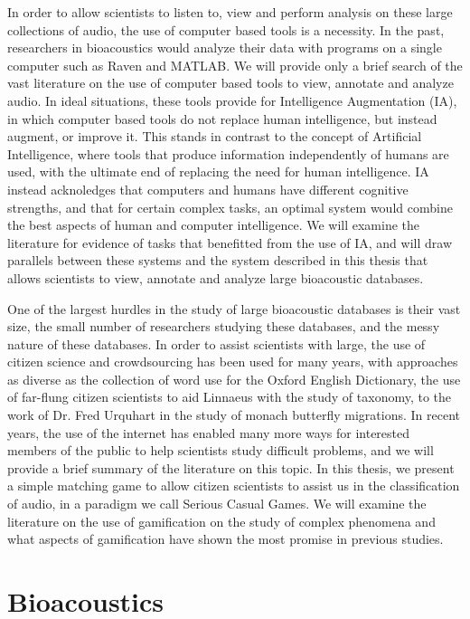 In order to allow scientists to listen to, view and perform analysis
on these large collections of audio, the use of computer based tools
is a necessity.  In the past, researchers in bioacoustics would
analyze their data with programs on a single computer such as Raven
and MATLAB.  We will provide only a brief search of the vast
literature on the use of computer based tools to view, annotate and
analyze audio.  In ideal situations, these tools provide for
Intelligence Augmentation (IA), in which computer based tools do not
replace human intelligence, but instead augment, or improve it.  This
stands in contrast to the concept of Artificial Intelligence, where
tools that produce information independently of humans are used, with
the ultimate end of replacing the need for human intelligence.  IA
instead acknoledges that computers and humans have different cognitive
strengths, and that for certain complex tasks, an optimal system would
combine the best aspects of human and computer intelligence.  We will
examine the literature for evidence of tasks that benefitted from the
use of IA, and will draw parallels between these systems and the
system described in this thesis that allows scientists to view,
annotate and analyze large bioacoustic databases.

One of the largest hurdles in the study of large bioacoustic databases
is their vast size, the small number of researchers studying these
databases, and the messy nature of these databases.  In order to
assist scientists with large, the use of citizen science and
crowdsourcing has been used for many years, with approaches as diverse
as the collection of word use for the Oxford English Dictionary, the
use of far-flung citizen scientists to aid Linnaeus with the study of
taxonomy, to the work of Dr. Fred Urquhart in the study of monach
butterfly migrations.  In recent years, the use of the internet has
enabled many more ways for interested members of the public to help
scientists study difficult problems, and we will provide a brief
summary of the literature on this topic.  In this thesis, we present a
simple matching game to allow citizen scientists to assist us in the
classification of audio, in a paradigm we call Serious Casual Games.
We will examine the literature on the use of gamification on the study
of complex phenomena and what aspects of gamification have shown the
most promise in previous studies.



\section{Bioacoustics}

